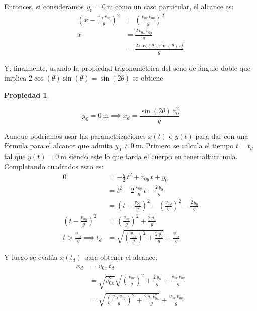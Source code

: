 \documentclass[a5paper,12pt,twoside]{book}
\newtheorem{prop}{{Propiedad}}[chapter]
\begin{document}
Entonces, si consideramos $y_0=\SI{0}{\metre}$ como un caso particular, el alcance es:
\begin{align*}
    \left(x - \frac{v_{0x} \, v_{0y}}{g}\right)^2 &= \left(\frac{v_{0x} \, v_{0y}}{g}\right)^2
    \\[1ex]
    x &= \frac{2 \, v_{0x} \, v_{0y}}{g}
    \\[1ex]
    &= \frac{2 \cos(\theta) \sin(\theta) \, v_0^2}{g}
\end{align*}

Y, finalmente, usando la propiedad trigonométrica del seno de ángulo doble que implica $2 \cos(\theta) \sin(\theta)=\sin(2\theta)$ se obtiene

\begin{mdframed}[style=MyFrame1]
    \begin{prop}
        \label{prop:oblicuoAlcance}
    \end{prop}
    \begin{equation*}
        y_0 = \SI{0}{\metre} \implies x_d = \frac{\sin(2\theta) \, v_0^2}{g}
    \end{equation*}
\end{mdframed}

Aunque podríamos usar las parametrizaciones $x(t)$ e $y(t)$ para dar con una fórmula para el alcance que admita $y_0 \neq \SI{0}{\metre}$.
Primero se calcula el tiempo $t=t_d$ tal que $y(t)=\SI{0}{\metre}$ siendo este lo que tarda el cuerpo en tener altura nula.
Completando cuadrados esto es:
\begin{align*}
    0 &= -\frac{g}{2} \, t^2 + v_{0y} \, t + y_0
    \\[1ex]
    &= t^2 - 2 \, \frac{v_{0y}}{g} \, t - \frac{2\,y_0}{g}
    \\[1ex]
    &= \left( t - \frac{v_{0y}}{g} \right)^2 - \left(\frac{v_{0y}}{g}\right)^2 - \frac{2\,y_0}{g}
    \\[1ex]
    \left( t - \frac{v_{0y}}{g} \right)^2 &= \left(\frac{v_{0y}}{g}\right)^2 + \frac{2\,y_0}{g}
    \\[1ex]
    t>\frac{v_{0y}}{g} \implies t_d &= \sqrt{\left(\frac{v_{0y}}{g}\right)^2 + \frac{2\,y_0}{g}} + \frac{v_{0y}}{g}
\end{align*}

Y luego se evalúa $x(t_d)$ para obtener el alcance:
\begin{align*}
    x_d &= v_{0x} \, t_d
    \\[1ex]
    &= \sqrt{v_{0x}^2} \sqrt{\left(\frac{v_{0y}}{g}\right)^2 + \frac{2\,y_0}{g}} + \frac{v_{0x}\,v_{0y}}{g}
    \\[1ex]
    &= \sqrt{\left(\frac{v_{0x}\,v_{0y}}{g}\right)^2 + \frac{2 \, y_0 \, v_{0x}^2}{g}} + \frac{v_{0x}\,v_{0y}}{g}
\end{align*}
\end{document}
